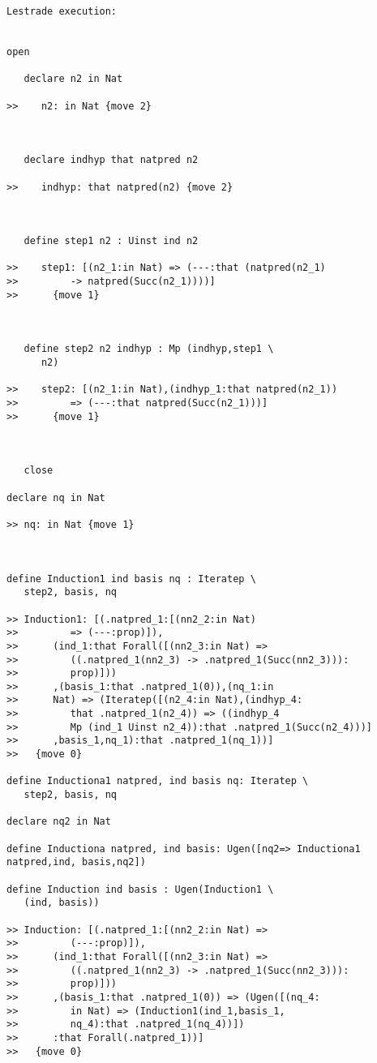 \documentclass[12pt]{article}
\begin{document}
\begin{verbatim}Lestrade execution:


open

   declare n2 in Nat

>>    n2: in Nat {move 2}



   declare indhyp that natpred n2

>>    indhyp: that natpred(n2) {move 2}



   define step1 n2 : Uinst ind n2

>>    step1: [(n2_1:in Nat) => (---:that (natpred(n2_1)
>>         -> natpred(Succ(n2_1))))]
>>      {move 1}



   define step2 n2 indhyp : Mp (indhyp,step1 \
      n2)

>>    step2: [(n2_1:in Nat),(indhyp_1:that natpred(n2_1))
>>         => (---:that natpred(Succ(n2_1)))]
>>      {move 1}



   close

declare nq in Nat

>> nq: in Nat {move 1}



define Induction1 ind basis nq : Iteratep \
   step2, basis, nq

>> Induction1: [(.natpred_1:[(nn2_2:in Nat)
>>         => (---:prop)]),
>>      (ind_1:that Forall([(nn2_3:in Nat) =>
>>         ((.natpred_1(nn2_3) -> .natpred_1(Succ(nn2_3))):
>>         prop)]))
>>      ,(basis_1:that .natpred_1(0)),(nq_1:in
>>      Nat) => (Iteratep([(n2_4:in Nat),(indhyp_4:
>>         that .natpred_1(n2_4)) => ((indhyp_4
>>         Mp (ind_1 Uinst n2_4)):that .natpred_1(Succ(n2_4)))]
>>      ,basis_1,nq_1):that .natpred_1(nq_1))]
>>   {move 0}

define Inductiona1 natpred, ind basis nq: Iteratep \
   step2, basis, nq

declare nq2 in Nat

define Inductiona natpred, ind basis: Ugen([nq2=> Inductiona1  natpred,ind, basis,nq2])

define Induction ind basis : Ugen(Induction1 \
   (ind, basis))

>> Induction: [(.natpred_1:[(nn2_2:in Nat) =>
>>         (---:prop)]),
>>      (ind_1:that Forall([(nn2_3:in Nat) =>
>>         ((.natpred_1(nn2_3) -> .natpred_1(Succ(nn2_3))):
>>         prop)]))
>>      ,(basis_1:that .natpred_1(0)) => (Ugen([(nq_4:
>>         in Nat) => (Induction1(ind_1,basis_1,
>>         nq_4):that .natpred_1(nq_4))])
>>      :that Forall(.natpred_1))]
>>   {move 0}


\end{verbatim}
\end{document}
